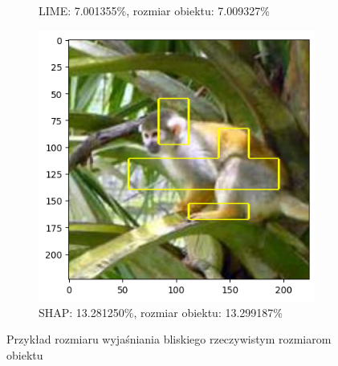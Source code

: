 \begin{figure}[h]
\begin{subfigure}[b]{0.3\textwidth}
		\caption{LIME: 7.001355\%, rozmiar obiektu: 7.009327\%}
	\end{subfigure}
	\begin{subfigure}[b]{0.3\textwidth}
		\includegraphics[width=.9\textwidth]{img/examples/appendix/n02493793_39302_shap}
		\caption{SHAP: 13.281250\%, rozmiar obiektu: 13.299187\%}
	\end{subfigure}
	\caption{Przykład rozmiaru wyjaśniania bliskiego rzeczywistym rozmiarom obiektu}
	\label{}
\end{figure}

